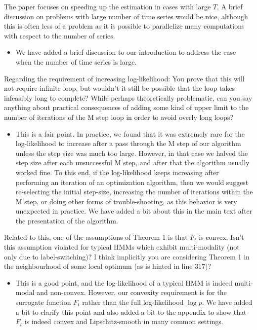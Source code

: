 \documentclass[11pt]{article}
\begin{document}
The paper focuses on speeding up the estimation in cases with large $T$. A brief discussion on problems with large number of time series would be nice, although this is often less of a problem as it is possible to parallelize many computations with respect to the number of series.

\begin{itemize}
    \item We have added a brief discussion to our introduction to address the case when the number of time series is large.
\end{itemize}

Regarding the requirement of increasing log-likelihood: You prove that this will not require infinite loop, but wouldn't it still be possible that the loop takes infeasibly long to complete? While perhaps theoretically problematic, can you say anything about practical consequences of adding some kind of upper limit to the number of iterations of the M step loop in order to avoid overly long loops? 

\begin{itemize}
    \item This is a fair point. In practice, we found that it was extremely rare for the log-likelihood to increase after a pass through the M step of our algorithm unless the step size was much too large. However, in that case we halved the step size after each unsuccessful M step, and after that the algorithm usually worked fine. To this end, if the log-likelihood keeps increasing after performing an iteration of an optimization algorithm, then we would suggest re-selecting the initial step-size, increasing the number of iterations within the M step, or doing other forms of trouble-shooting, as this behavior is very unexpected in practice. We have added a bit about this in the main text after the presentation of the algorithm.
\end{itemize}

Related to this, one of the assumptions of Theorem 1 is that $F_t$ is convex. Isn't this assumption violated for typical HMMs which exhibit multi-modality (not only due to label-switching)? I think implicitly you are considering Theorem 1 in the neighbourhood of some local optimum (as is hinted in line 317)? 

\begin{itemize}
    \item This is a good point, and the log-likelihood of a typical HMM is indeed multi-modal and non-convex. However, our convexity requirement is for the surrogate function $F_t$ rather than the full log-likelihood $\log p$. We have added a bit to clarify this point and also added a bit to the appendix to show that $F_t$ is indeed convex and Lipschitz-smooth in many common settings.
\end{itemize}
\end{document}
